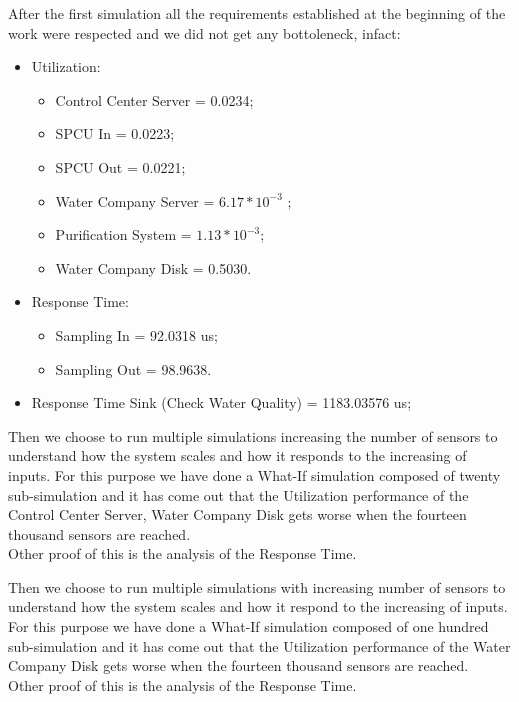 After the first simulation all the requirements established at the beginning of the work were respected and we did not get any bottoleneck, infact: 
\begin{itemize}
	\item Utilization:
	\begin{itemize}
		\item Control Center Server = 0.0234;
		\item SPCU In = 0.0223;
		\item SPCU Out = 0.0221;
		\item Water Company Server = $ 6.17*10^{-3}$ ;
		\item Purification System = $ 1.13*10^{-3}$;
		\item Water Company Disk = 0.5030.
	\end{itemize}
	\item Response Time:
	\begin{itemize}
		\item Sampling In = 92.0318 us;
		\item Sampling Out = 98.9638.
	\end{itemize}
	\item Response Time Sink (Check Water Quality) = 1183.03576 us;
\end{itemize}

Then we choose to run multiple simulations increasing the number of sensors to understand how the system scales and how it responds to the increasing of inputs. For this purpose we have done a What-If simulation composed of twenty sub-simulation and it has come out that the Utilization performance of the Control Center Server, Water Company Disk gets worse when the fourteen thousand sensors are reached.\\
Other proof of this is the analysis of the Response Time.

\begin{center}
\end{center}

\begin{center}
\end{center}
\bigskip

Then we choose to run multiple simulations with increasing
number of sensors to understand how the system scales and how it
respond to the increasing of inputs. For this purpose we have done a What-If simulation composed of one hundred sub-simulation and it has come out that the Utilization performance of the Water Company Disk gets worse when the fourteen thousand sensors are reached.\\
Other proof of this is the analysis of the Response Time.

